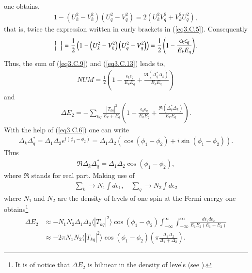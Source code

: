one obtains,
\begin{align}
1-\left(U_k^2-V_k^2\right)\left(U_q^2-V_q^2\right)=2\left(U_k^2V_q^2+V_k^2U_q^2\right),
\end{align}
that is, twice the expression written in curly brackets in (\ref{eq3.C.5}). Consequently
\begin{align}\label{eq3.C.13}
\left\{\vphantom{\left(U_q^2-V_q^2\right)}\;\;\right\}=\frac{1}{2}\left(1-\left(U_k^2-V_k^2\right)\left(U_q^2-V_q^2\right)\right)=\frac{1}{2}\left(1-\frac{\epsilon_k\epsilon_q}{E_kE_q}\right).
\end{align}
Thus, the sum of (\ref{eq3.C.9}) and (\ref{eq3.C.13}) leads to,
\begin{align}
NUM=\frac{1}{2}\left(1-\frac{\epsilon_k\epsilon_q}{E_kE_q}+\frac{\Re(\Delta_q^*\Delta_k)}{E_kE_q}\right)
\end{align}
and
\begin{align}
\Delta E_2=-\sum_{kq}\frac{|T_{kq}|^2}{E_k+E_q}\left(1-\frac{\epsilon_k\epsilon_q}{E_kE_q}+\frac{\Re(\Delta_q^*\Delta_k)}{E_kE_q}\right).
\end{align}
With the help of (\ref{eq3.C.6}) one can write
\begin{align}
\Delta_k\Delta_q^*=\Delta_1\Delta_2e^{i(\phi_1-\phi_2)}=\Delta_1\Delta_2\left(\cos(\phi_1-\phi_2)+i\sin(\phi_1-\phi_2)\right).
\end{align}
Thus
\begin{align}
\Re\Delta_k\Delta_q^*=\Delta_1\Delta_2\cos(\phi_1-\phi_2),
\end{align}
where $\Re$ stands for real part. Making use of
\begin{align}
\sum_k\rightarrow N_1\int d\epsilon_1,\quad\sum_q\rightarrow N_2\int d\epsilon_2
\end{align}
where $N_1$ and $N_2$ are the density of levels of one spin at the Fermi energy one  obtains\footnote{It is of notice that $\Delta E_2$ is bilinear in the density of levels (see \cite{Potel:17}).}
\begin{align}\label{eq3.6.19}
\nonumber\Delta E_2&\approx-N_1N_2\Delta_1 \Delta_2 \langle|T_{kq}|^2\rangle \cos(\phi_1-\phi_2)\int_{-\infty}^{\infty}\int_{-\infty}^{\infty}\frac{d\epsilon_1 d\epsilon_2}{E_1 E_2(E_1+E_2)}\\
&\approx -2\pi N_1 N_2 \langle|T_{kq}|^2\rangle \cos(\phi_1-\phi_2) \left(\pi\frac{\Delta_1\Delta_2}{\Delta_1+\Delta_2}\right).
\end{align}
